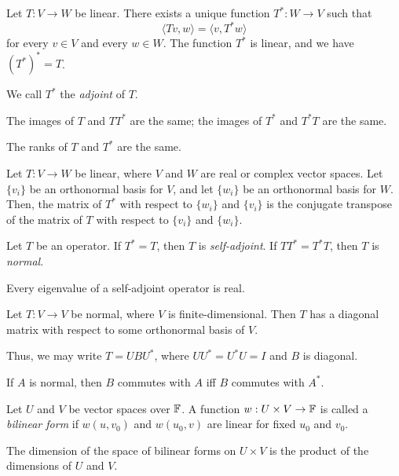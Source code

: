 \begin{prop}
  Let $T:V\to W$ be linear. There exists a unique function $T^*:W\to V$ such
  that
  \[\langle Tv,w\rangle=\langle v,T^* w\rangle\] for every $v\in V$ and every
  $w\in W$. The function $T^*$ is linear, and we have $(T^*)^*=T$.
\end{prop}
\begin{defn}
  We call $T^*$ the \emph{adjoint} of $T$.
\end{defn}
\begin{prop}
    The images of $T$ and $TT^*$ are the same; the images of $T^*$ and $T^* T$
    are the same.
\end{prop}
\begin{cor}
    The ranks of $T$ and $T^*$ are the same.
\end{cor}
\begin{prop}
  Let $T:V\to W$ be linear, where $V$ and $W$ are real or complex vector spaces.
  Let $\{v_i\}$ be an orthonormal basis for $V$, and
  let $\{w_i\}$ be an orthonormal basis for $W$. Then, the matrix of $T^*$ with
  respect to $\{w_i\}$ and $\{v_i\}$ is the conjugate transpose of the matrix of
  $T$ with respect to $\{v_i\}$ and $\{w_i\}$.
\end{prop}
\begin{defn}
  Let $T$ be an operator. If $T^*=T$, then $T$ is \emph{self-adjoint}. If
  $TT^*=T^* T$, then $T$ is \emph{normal}.
\end{defn}
\begin{prop}
  Every eigenvalue of a self-adjoint operator is real.
\end{prop}
\begin{thm}[Spectral]
  Let $T:V\to V$ be normal, where $V$ is finite-dimensional. Then
  $T$ has a diagonal matrix with respect to some orthonormal basis of $V$.
\end{thm}
\begin{rem}
  Thus, we may write $T=UBU^*$, where $UU^*=U^*U=I$ and $B$ is diagonal.
\end{rem}
\begin{prop}
  If $A$ is normal, then $B$ commutes with $A$ iff $B$ commutes with $A^*$.
\end{prop}
\begin{defn}
  Let $U$ and $V$ be vector spaces over $\mathbb{F}$. A function $w:U\times V\to\mathbb{F}$
  is called a \emph{bilinear form} if $w(u,v_0)$ and $w(u_0,v)$ are linear for
  fixed $u_0$ and $v_0$.
\end{defn}
\begin{prop}
  The dimension of the space of bilinear forms on $U\times V$ is the product of
  the dimensions of $U$ and $V$.
\end{prop}
